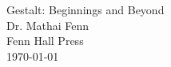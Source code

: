 
\thispagestyle{empty}
\begin{center}
{\Huge Gestalt: Beginnings and Beyond}\\[2ex]
{\Large Dr. Mathai Fenn}\\[4ex]
{\large Fenn Hall Press}\\[12ex]
{\large \today}
\end{center}
\clearpage
